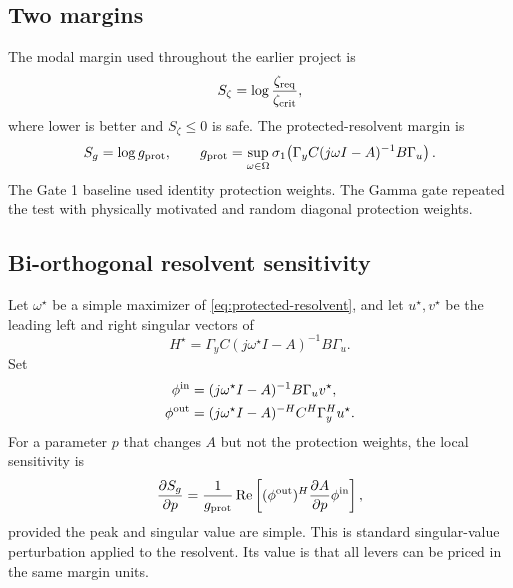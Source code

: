 \documentclass[11pt]{article}
\newcommand{\Real}{\operatorname{Re}}
\newcommand{\zetaReq}{\zeta_{\rm req}}
\begin{document}
\subsection{Two margins}

The modal margin used throughout the earlier project is
\begin{equation}
  S_\zeta=\log\frac{\zetaReq}{\zeta_{\rm crit}},
  \label{eq:modal-margin}
\end{equation}
where lower is better and $S_\zeta\le0$ is safe. The protected-resolvent margin is
\begin{equation}
  S_g=\log g_{\rm prot},\qquad
  g_{\rm prot}=\sup_{\omega\in\Omega}
  \sigma_1\!\left(
  \Gamma_y C(j\omega I-A)^{-1}B\Gamma_u
  \right).
  \label{eq:protected-resolvent}
\end{equation}
The Gate 1 baseline used identity protection weights. The Gamma gate repeated
the test with physically motivated and random diagonal protection weights.

\subsection{Bi-orthogonal resolvent sensitivity}

Let $\omega^\star$ be a simple maximizer of \eqref{eq:protected-resolvent}, and
let $u^\star,v^\star$ be the leading left and right singular vectors of
\[
  H^\star=\Gamma_y C(j\omega^\star I-A)^{-1}B\Gamma_u.
\]
Set
\begin{align}
  \phi^{\rm in}&=(j\omega^\star I-A)^{-1}B\Gamma_u v^\star,\\
  \phi^{\rm out}&=(j\omega^\star I-A)^{-H}C^H\Gamma_y^H u^\star .
\end{align}
For a parameter $p$ that changes $A$ but not the protection weights, the local
sensitivity is
\begin{equation}
  \frac{\partial S_g}{\partial p}
  =
  \frac{1}{g_{\rm prot}}
  \Real\left[
  (\phi^{\rm out})^H
  \frac{\partial A}{\partial p}
  \phi^{\rm in}
  \right],
  \label{eq:resolvent-sensitivity}
\end{equation}
provided the peak and singular value are simple. This is standard singular-value
perturbation applied to the resolvent. Its value is that all levers can be
priced in the same margin units.
\end{document}
